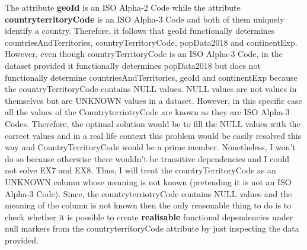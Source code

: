 \documentclass{article}
\begin{document}
The attribute \textbf{geoId} is an ISO Alpha-2 Code while the attribute \textbf{countryterritoryCode} is an ISO Alpha-3 Code and both of them uniquely identify a country. Therefore, it follows that geoId functionally determines countriesAndTerritories, countryTerritoryCode, popData2018 and continentExp. However, even though countryTerritoryCode is an ISO Alpha-3 Code, in the dataset provided it functionally determines popData2018 but does not functionally determine countriesAndTerritories, geoId and continentExp because the countryTerritoryCode contains NULL values. NULL values are not values in themselves but are UNKNOWN values in a dataset. However, in this specific case all the values of the CountryterriotryCode are known as they are ISO Alpha-3 Codes. Therefore, the optimal solution would be to fill the NULL values with the correct values and in a real life context this problem would be easily resolved this way and CountryTerritoryCode would be a prime member. Nonetheless, I won't do so because otherwise there wouldn't be transitive dependencies and I could not solve EX7 and EX8. Thus, I will treat the countryTerritoryCode as an UNKNOWN column whose meaning is not known (pretending it is not an ISO Alpha-3 Code). Since, the countryterriotryCode contains NULL values and the meaning of the column is not known then the only reasonable thing to do is to check whether it is possible to create \textbf{realisable} functional dependencies under null markers from the countryterritoryCode attribute by just inspecting the data provided.
\end{document}

